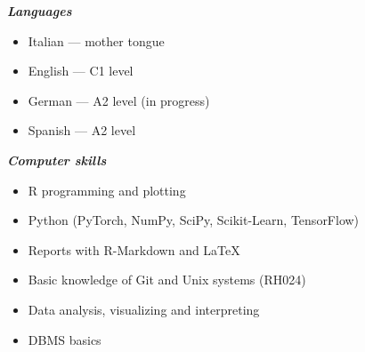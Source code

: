 \documentclass[10pt]{article}
\begin{document}
	\textbf{\textit{Languages}}
	\vspace{-1mm}
	\begin{itemize}
		\item Italian --- mother tongue
		\item English --- C1 level
		\item German --- A2 level (in progress)
		\item Spanish --- A2 level
	\end{itemize}
	\medskip
	\textbf{\textit{Computer skills}}
	\vspace{-1mm}
	\begin{itemize}
		\item R programming and plotting
		\item Python (PyTorch, NumPy, SciPy, Scikit-Learn, TensorFlow)
		\item Reports with R-Markdown and LaTeX
		\item Basic knowledge of Git and Unix systems (RH024)
		\item Data analysis, visualizing and interpreting
		\item DBMS basics
	\end{itemize}
	\medskip
	
\end{document}
